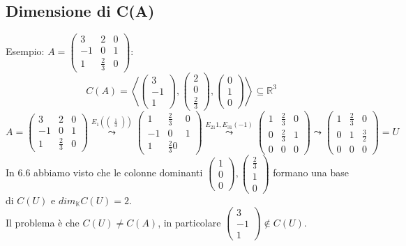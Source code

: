 \documentclass[12pt]{article}
\begin{document}
\subsection{Dimensione di C(A)}
Esempio: $A = \begin{pmatrix}
    3 & 2 & 0\\
    -1 & 0 & 1\\
    1 & \frac{2}{3} & 0
\end{pmatrix}$:
\[C(A) = \left<\begin{pmatrix}
    3\\
    -1\\
    1
\end{pmatrix}, \begin{pmatrix}
    2\\
    0\\
    \frac{2}{3}
\end{pmatrix}, \begin{pmatrix}
    0\\
    1\\
    0
\end{pmatrix}\right> \subseteq \mathbb{R}^3\]
\[A = \begin{pmatrix}
    3 & 2 & 0\\
    -1 & 0 & 1\\
    1 & \frac{2}{3} & 0
\end{pmatrix} \stackrel{E_1\left(\begin{pmatrix}
    \frac{1}{3}
\end{pmatrix}\right)}{\leadsto} \begin{pmatrix}
    1 & \frac{2}{3} & 0\\
    -1 & 0 & 1\\
    1 & \frac{2}{3} 0
\end{pmatrix} \stackrel{E_{21}1, E_{31}(-1)}{\leadsto} \begin{pmatrix}
    1 & \frac{2}{3} & 0\\
    0 & \frac{2}{3} & 1\\
    0 & 0 & 0
\end{pmatrix} \leadsto \begin{pmatrix}
    1 & \frac{2}{3} & 0\\
    0 & 1 & \frac{3}{2}\\
    0 & 0 & 0
\end{pmatrix} = U\]
In 6.6 abbiamo visto che le colonne dominanti $\begin{pmatrix}
    1\\
    0\\
    0
\end{pmatrix}, \begin{pmatrix}
    \frac{2}{3}\\
    1\\
    0
\end{pmatrix}$ formano una base di $C(U)$ e $dim_{\mathbb{K}}C(U) = 2$.\\
Il problema è che $C(U) \neq C(A)$, in particolare $\begin{pmatrix}
    3\\
    -1\\
    1
\end{pmatrix} \notin C(U)$.
\end{document}
